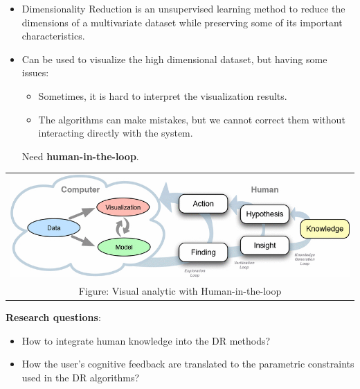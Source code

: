 \documentclass[portrait,final,a0paper]{nadiposter}
\newcommand{\pointer}{\scalebox{1.0}{\ding{43}}}%
\newcommand{\compresslist}{%
\setlength{\itemsep}{1pt}%
\setlength{\parskip}{0pt}%
\setlength{\parsep}{0pt}%
\setlength{\leftmargin}{0pt}%
}
\begin{document}
\begin{poster}
{\begin{minipage}{0.45\linewidth}
\begin{itemize}
    \item Dimensionality Reduction is an {\color{blue} unsupervised learning} method to reduce the dimensions of a multivariate dataset while \qquad preserving some of its important characteristics.
    \item Can be used to {\color{blue}visualize the high dimensional dataset}, but \quad having some issues:
    \noindent
    \begin{itemize}
        \compresslist
        \item Sometimes, it is hard to interpret the visualization results.
        \item The algorithms can make mistakes, but we cannot correct them without interacting directly with the system.
    \end{itemize}
    \scalebox{2}{\pointer} Need \textbf{human-in-the-loop}.
\end{itemize}
\end{minipage}
\begin{minipage}{0.48\linewidth}
\begin{center}
\begin{tabular}{c}
    \includegraphics[width=0.75\linewidth]{poster_idr01_UNamur_2017/figures/ml_with_human.png}\\
    \scriptsize{Figure: Visual analytic with Human-in-the-loop \cite{Sacha2017Interaction}}
\end{tabular}
\end{center}
\qquad\textbf{Research questions}:
\begin{itemize}
    \compresslist
    \item How to {\color{blue} integrate human knowledge} into the DR methods?
    \item How the user's {\color{blue} cognitive feedback} are translated to the {\color{blue} parametric constraints} used in the DR algorithms?
\end{itemize}
\end{minipage}
}

\end{poster}
\end{document}
